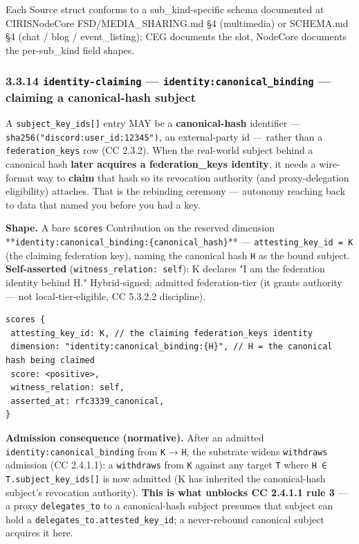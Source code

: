\documentclass[11pt]{article}
\begin{document}
Each Source struct conforms to a sub\_kind-specific schema documented at CIRISNodeCore FSD/MEDIA\_SHARING.md §4 (multimedia) or SCHEMA.md §4 (chat / blog / event\_listing); CEG documents the slot, NodeCore documents the per-sub\_kind field shapes.


\subsubsection*{3.3.14 \texttt{identity-claiming} — \texttt{identity:canonical\_binding} — claiming a canonical-hash subject}


A \texttt{subject\_key\_ids[]} entry MAY be a \textbf{canonical-hash} identifier — \texttt{sha256("discord:user\_id:12345")}, an external-party id — rather than a \texttt{federation\_keys} row (CC 2.3.2). When the real-world subject behind a canonical hash \textbf{later acquires a federation\_keys identity}, it needs a wire-format way to \textbf{claim} that hash so its revocation authority (and proxy-delegation eligibility) attaches. That is the rebinding ceremony — autonomy reaching back to data that named you before you had a key.


\textbf{Shape.} A bare \texttt{scores} Contribution on the reserved dimension **\texttt{identity:canonical\_binding:\{canonical\_hash\}}** — \texttt{attesting\_key\_id = K} (the claiming federation key), naming the canonical hash \texttt{H} as the bound subject. \textbf{Self-asserted} (\texttt{witness\_relation: self}): K declares "I am the federation identity behind H." Hybrid-signed; admitted federation-tier (it grants authority — not local-tier-eligible, CC 5.3.2.2 discipline).


\begin{lstlisting}
scores {
 attesting_key_id: K, // the claiming federation_keys identity
 dimension: "identity:canonical_binding:{H}", // H = the canonical hash being claimed
 score: <positive>,
 witness_relation: self,
 asserted_at: rfc3339_canonical,
}
\end{lstlisting}

\textbf{Admission consequence (normative).} After an admitted \texttt{identity:canonical\_binding} from \texttt{K} → \texttt{H}, the substrate widens \texttt{withdraws} admission (CC 2.4.1.1): a \texttt{withdraws} from \texttt{K} against any target \texttt{T} where \texttt{H ∈ T.subject\_key\_ids[]} is now admitted (K has inherited the canonical-hash subject's revocation authority). \textbf{This is what unblocks CC 2.4.1.1 rule 3} — a proxy \texttt{delegates\_to} to a canonical-hash subject presumes that subject can hold a \texttt{delegates\_to.attested\_key\_id}; a never-rebound canonical subject acquires it here.
\end{document}
